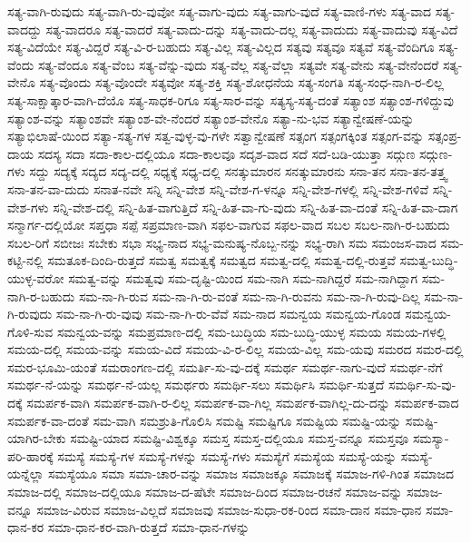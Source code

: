 {ಸತ್ಯ-ವಾಗಿ-ರುವುದು
ಸತ್ಯ-ವಾಗಿ-ರು-ವುವೋ
ಸತ್ಯ-ವಾಗು-ವುದು
ಸತ್ಯ-ವಾಗು-ವುದೆ
ಸತ್ಯ-ವಾಣಿ-ಗಳು
ಸತ್ಯ-ವಾದ
ಸತ್ಯ-ವಾದದ್ದು
ಸತ್ಯ-ವಾದರೂ
ಸತ್ಯ-ವಾದರೆ
ಸತ್ಯ-ವಾದು-ದನ್ನು
ಸತ್ಯ-ವಾದು-ದಲ್ಲ
ಸತ್ಯ-ವಾದುದು
ಸತ್ಯ-ವಾದುವು
ಸತ್ಯ-ವಿದೆ
ಸತ್ಯ-ವಿದೆಯೇ
ಸತ್ಯ-ವಿದ್ದರೆ
ಸತ್ಯ-ವಿ-ರ-ಬಹುದು
ಸತ್ಯ-ವಿಲ್ಲ
ಸತ್ಯ-ವಿಲ್ಲದ
ಸತ್ಯವು
ಸತ್ಯವೂ
ಸತ್ಯವೆ
ಸತ್ಯ-ವೆಂದಿಗೂ
ಸತ್ಯ-ವೆಂದು
ಸತ್ಯ-ವೆಂದೂ
ಸತ್ಯ-ವೆಂಬ
ಸತ್ಯ-ವೆನ್ನು-ವುದು
ಸತ್ಯ-ವೆಲ್ಲ
ಸತ್ಯ-ವೆಲ್ಲಾ
ಸತ್ಯವೇ
ಸತ್ಯ-ವೇನು
ಸತ್ಯ-ವೇನೆಂದರೆ
ಸತ್ಯ-ವೇನೊ
ಸತ್ಯ-ವೊಂದು
ಸತ್ಯ-ವೊಂದೇ
ಸತ್ಯವೋ
ಸತ್ಯ-ಶಕ್ತಿ
ಸತ್ಯ-ಶೋಧನೆಯ
ಸತ್ಯ-ಸಂಗತಿ
ಸತ್ಯ-ಸಂಧ-ನಾಗಿ-ರ-ಲಿಲ್ಲ
ಸತ್ಯ-ಸಾಕ್ಷಾತ್ಕಾರ-ವಾಗಿ-ದೆಯೊ
ಸತ್ಯ-ಸಾಧಕ-ರಿಗೂ
ಸತ್ಯ-ಸಾರ-ವನ್ನು
ಸತ್ಯಸ್ಯ-ಸತ್ಯ-ದಂತೆ
ಸತ್ಯಾಂಶ
ಸತ್ಯಾಂಶ-ಗಳಿದ್ದುವು
ಸತ್ಯಾಂಶ-ವನ್ನು
ಸತ್ಯಾಂಶವೇ
ಸತ್ಯಾಂಶ-ವೇ-ನೆಂದರೆ
ಸತ್ಯಾಂಶ-ವೇನೊ
ಸತ್ಯಾ-ನು-ಭವ
ಸತ್ಯಾನ್ವೇಷಣೆ-ಯನ್ನು
ಸತ್ಯಾಭಿಲಾಷೆ-ಯಿಂದ
ಸತ್ಯಾ-ಸತ್ಯ-ಗಳ
ಸತ್ವ-ವುಳ್ಳ-ವು-ಗಳೇ
ಸತ್ವಾನ್ವೇಷಣೆ
ಸತ್ಸಂಗ
ಸತ್ಸಂಗಕ್ಕಿಂತ
ಸತ್ಸಂಗ-ವನ್ನು
ಸತ್ಸಂಪ್ರ-ದಾಯ
ಸದಸ್ಯ
ಸದಾ
ಸದಾ-ಕಾಲ-ದಲ್ಲಿಯೂ
ಸದಾ-ಕಾಲವೂ
ಸದೃಶ-ವಾದ
ಸದೆ
ಸದೆ-ಬಡಿ-ಯುತ್ತಾ
ಸದ್ಗುಣ
ಸದ್ಗುಣ-ಗಳು
ಸದ್ದು
ಸದ್ಯಕ್ಕೆ
ಸದ್ಯದ
ಸದ್ಯ-ದಲ್ಲಿ
ಸಧ್ಯಕ್ಕೆ
ಸಧ್ಯ-ದಲ್ಲಿ
ಸನತ್ಕುಮಾರನ
ಸನತ್ಕುಮಾರನು
ಸನಾ-ತನ
ಸನಾ-ತನ-ತತ್ತ್ವ
ಸನಾ-ತನ-ವಾ-ದುದು
ಸನಾತ-ನವೇ
ಸನ್ನಿ
ಸನ್ನಿ-ವೇಶ
ಸನ್ನಿ-ವೇಶ-ಗ-ಳನ್ನೂ
ಸನ್ನಿ-ವೇಶ-ಗಳಲ್ಲಿ
ಸನ್ನಿ-ವೇಶ-ಗಳಿವೆ
ಸನ್ನಿ-ವೇಶ-ಗಳು
ಸನ್ನಿ-ವೇಶ-ದಲ್ಲಿ
ಸನ್ನಿ-ಹಿತ-ವಾಗುತ್ತಿದೆ
ಸನ್ನಿ-ಹಿತ-ವಾ-ಗು-ವುದು
ಸನ್ನಿ-ಹಿತ-ವಾ-ದಂತೆ
ಸನ್ನಿ-ಹಿತ-ವಾ-ದಾಗ
ಸನ್ಮಾರ್ಗ-ದಲ್ಲಿಯೋ
ಸಪ್ತಧಾ
ಸಪ್ಪೆ
ಸಪ್ರಮಾಣ-ವಾಗಿ
ಸಫಲ-ವಾಗುವ
ಸಫಲ-ವಾದ
ಸಬಲ
ಸಬಲ-ನಾಗಿ-ರ-ಬಹುದು
ಸಬಲ-ರಿಗೆ
ಸಬೀಜಃ
ಸಬೇಕು
ಸಭಾ
ಸಭ್ಯ-ನಾದ
ಸಭ್ಯ-ಮನುಷ್ಯ-ನೊಬ್ಬ-ನನ್ನು
ಸಭ್ಯ-ರಾಗಿ
ಸಮ
ಸಮಂಜಸ-ವಾದ
ಸಮ-ಕಟ್ಟಿ-ನಲ್ಲಿ
ಸಮತೂಕ-ದಿಂದಿ-ರುತ್ತದೆ
ಸಮತ್ವ
ಸಮತ್ವಕ್ಕೆ
ಸಮತ್ವದ
ಸಮತ್ವ-ದಲ್ಲಿ
ಸಮತ್ವ-ದಲ್ಲಿ-ರುತ್ತವೆ
ಸಮತ್ವ-ಬುದ್ಧಿ-ಯುಳ್ಳ-ವರೋ
ಸಮತ್ವ-ವನ್ನು
ಸಮತ್ವವು
ಸಮ-ದೃಷ್ಟಿ-ಯಿಂದ
ಸಮ-ನಾಗಿ
ಸಮ-ನಾಗಿದ್ದರೆ
ಸಮ-ನಾಗಿದ್ದಾಗ
ಸಮ-ನಾಗಿ-ರ-ಬಹುದು
ಸಮ-ನಾ-ಗಿ-ರುವ
ಸಮ-ನಾ-ಗಿ-ರು-ವಂತೆ
ಸಮ-ನಾ-ಗಿ-ರುವನು
ಸಮ-ನಾ-ಗಿ-ರುವು-ದಿಲ್ಲ
ಸಮ-ನಾ-ಗಿ-ರುವುದು
ಸಮ-ನಾ-ಗಿ-ರು-ವುವು
ಸಮ-ನಾ-ಗಿ-ರು-ವೆವೆ
ಸಮ-ನಾದ
ಸಮನ್ವಯ
ಸಮನ್ವಯ-ಗೊಂಡ
ಸಮನ್ವಯ-ಗೊಳಿ-ಸುವ
ಸಮನ್ವಯ-ವನ್ನು
ಸಮಪ್ರಮಾಣ-ದಲ್ಲಿ
ಸಮ-ಬುದ್ಧಿಯ
ಸಮ-ಬುದ್ಧಿ-ಯುಳ್ಳ
ಸಮಯ
ಸಮಯ-ಗಳಲ್ಲಿ
ಸಮಯ-ದಲ್ಲಿ
ಸಮಯ-ವನ್ನು
ಸಮಯ-ವಿದೆ
ಸಮಯ-ವಿ-ರ-ಲಿಲ್ಲ
ಸಮಯ-ವಿಲ್ಲ
ಸಮ-ಯವು
ಸಮರದ
ಸಮರ-ದಲ್ಲಿ
ಸಮರ-ಭೂಮಿ-ಯಂತೆ
ಸಮರಾಂಗಣ-ದಲ್ಲಿ
ಸಮರ್ತಿ-ಸು-ವು-ದಕ್ಕೆ
ಸಮರ್ಥ
ಸಮರ್ಥ-ನಾಗು-ವುದೆ
ಸಮರ್ಥ-ನೆಗೆ
ಸಮರ್ಥ-ನೆ-ಯನ್ನು
ಸಮರ್ಥ-ನೆ-ಯಲ್ಲ
ಸಮರ್ಥರು
ಸಮರ್ಥಿ-ಸಲು
ಸಮರ್ಥಿಸಿ
ಸಮರ್ಥಿ-ಸುತ್ತದೆ
ಸಮರ್ಥಿ-ಸು-ವು-ದಕ್ಕೆ
ಸಮರ್ಪಕ-ವಾಗಿ
ಸಮರ್ಪಕ-ವಾಗಿ-ರ-ಲಿಲ್ಲ
ಸಮರ್ಪಕ-ವಾ-ಗಿಲ್ಲ
ಸಮರ್ಪಕ-ವಾಗಿಲ್ಲ-ದು-ದನ್ನು
ಸಮರ್ಪಕ-ವಾದ
ಸಮರ್ಪಕ-ವಾ-ದಂತೆ
ಸಮ-ವಾಗಿ
ಸಮಶ್ರುತಿ-ಗೊಲಿಸಿ
ಸಮಷ್ಟಿ
ಸಮಷ್ಟಿಗೂ
ಸಮಷ್ಟಿಯ
ಸಮಷ್ಟಿ-ಯನ್ನು
ಸಮಷ್ಟಿ-ಯಾಗಿರ-ಬೇಕು
ಸಮಷ್ಟಿ-ಯಾದ
ಸಮಷ್ಟಿ-ವಿಶ್ವಕ್ಕೂ
ಸಮಸ್ತ
ಸಮಸ್ತ-ದಲ್ಲಿಯೂ
ಸಮಸ್ತ-ವನ್ನೂ
ಸಮಸ್ತವೂ
ಸಮಸ್ಯಾ-ಪರಿ-ಹಾರಕ್ಕೆ
ಸಮಸ್ಯೆ
ಸಮಸ್ಯೆ-ಗಳ
ಸಮಸ್ಯೆ-ಗಳನ್ನು
ಸಮಸ್ಯೆ-ಗಳು
ಸಮಸ್ಯೆಗೆ
ಸಮಸ್ಯೆಯ
ಸಮಸ್ಯೆ-ಯನ್ನು
ಸಮಸ್ಯೆ-ಯನ್ನೆಲ್ಲಾ
ಸಮಸ್ಯೆಯೂ
ಸಮಾ
ಸಮಾ-ಚಾರ-ವನ್ನು
ಸಮಾಜ
ಸಮಾಜಕ್ಕೂ
ಸಮಾಜಕ್ಕೆ
ಸಮಾಜ-ಗಳಿ-ಗಿಂತ
ಸಮಾಜದ
ಸಮಾಜ-ದಲ್ಲಿ
ಸಮಾಜ-ದಲ್ಲಿಯೂ
ಸಮಾಜ-ದ-ಷೆಟೇ
ಸಮಾಜ-ದಿಂದ
ಸಮಾಜ-ರಚನೆ
ಸಮಾಜ-ವನ್ನು
ಸಮಾಜ-ವನ್ನೂ
ಸಮಾಜ-ವಿರುವ
ಸಮಾಜ-ವಿಲ್ಲದೆ
ಸಮಾಜವು
ಸಮಾಜ-ಸುಧಾ-ರಕ-ರಿಂದ
ಸಮಾ-ದಾನ
ಸಮಾ-ಧಾನ
ಸಮಾ-ಧಾನ-ಕರ
ಸಮಾ-ಧಾನ-ಕರ-ವಾಗಿ-ರುತ್ತದೆ
ಸಮಾ-ಧಾನ-ಗಳನ್ನು
}

